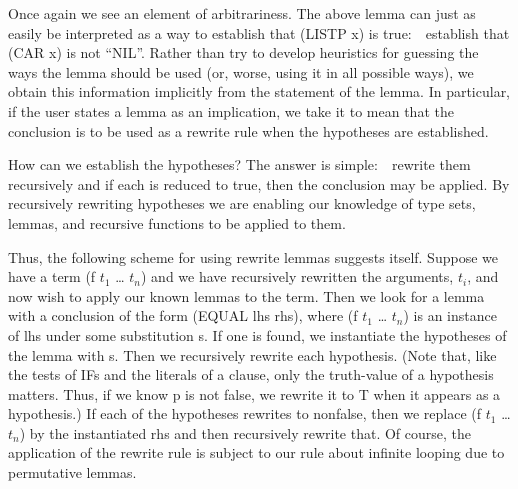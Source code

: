 \documentclass[11pt]{book}
\begin{document}
Once again we see an element of arbitrariness.
The above lemma can just as easily be interpreted as a way
to establish that (LISTP x) is true:~~establish that (CAR x) is not ``NIL''.
Rather than try to develop heuristics for guessing the ways the lemma
should be used (or, worse, using it in all possible ways), we
obtain this information implicitly from the statement
of the lemma.  In particular, if the user states a lemma as an
implication, we take it to mean that the conclusion is to be used
as a rewrite rule when the hypotheses are established.

How can we establish the hypotheses?  The answer is simple:~~rewrite them
recursively and if each is reduced to true, then the conclusion may be
applied.  By recursively rewriting hypotheses
we are enabling our knowledge of type sets, lemmas,
and recursive functions to be applied to them.

Thus, the following scheme for using rewrite lemmas suggests itself.
Suppose we have a term (f $t_{1}$ \ldots{} $t_{n}$) and we have recursively
rewritten the arguments, $t_{i}$, and now wish to apply our known
lemmas to the term.  Then we look for a lemma with a conclusion
of the form (EQUAL lhs rhs), where  (f $t_{1}$ \ldots{} $t_{n}$)   is an instance of lhs
under some substitution s.
If one is found, we instantiate the hypotheses of the lemma with s.
Then we recursively rewrite each hypothesis.  (Note that,
like the tests of IFs and the literals of a clause, only the
truth-value of a hypothesis matters.    Thus, if we know p is not false, we  rewrite it to T
when it appears as a hypothesis.)  If each of the hypotheses
rewrites to nonfalse, then we  replace (f $t_{1}$ \ldots{} $t_{n}$) by
the instantiated rhs and then recursively rewrite that.  Of course,
the application of the rewrite rule  is subject to our
rule about infinite looping due to permutative lemmas.
\end{document}
